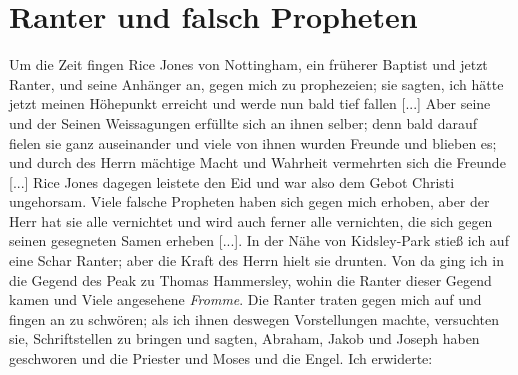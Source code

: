 \section{Ranter und falsch Propheten}

Um die Zeit fingen Rice Jones 
von Nottingham, ein früherer
Baptist und jetzt Ranter, und 
seine Anhänger an, gegen mich
zu prophezeien; sie sagten, ich hätte 
jetzt meinen Höhepunkt
erreicht und werde nun bald tief fallen [...] Aber seine und
der Seinen Weissagungen erfüllte sich 
an ihnen selber; denn bald
darauf fielen sie ganz auseinander und viele von ihnen wurden
Freunde und blieben es; und durch des Herrn mächtige Macht und
Wahrheit vermehrten sich die Freunde [...] Rice Jones 
dagegen leistete den Eid und war also dem Gebot Christi 
ungehorsam. Viele falsche Propheten 
haben sich gegen mich erhoben,
aber der Herr hat sie alle vernichtet und wird auch ferner alle
vernichten, die sich gegen seinen gesegneten Samen erheben [...].
In der Nähe von Kidsley-Park stieß ich auf 
eine Schar Ranter; aber die Kraft des Herrn 
hielt sie drunten. Von da
ging ich in die Gegend des Peak zu Thomas 
Hammersley,
wohin die Ranter dieser Gegend kamen und Viele angesehene
\textit{Fromme}. Die Ranter traten gegen mich auf und fingen an
zu schwören; als ich ihnen deswegen Vorstellungen machte, 
versuchten sie, Schriftstellen zu bringen und sagten, Abraham, Jakob
und Joseph haben geschworen und die Priester und Moses und
die Engel. Ich erwiderte: 


